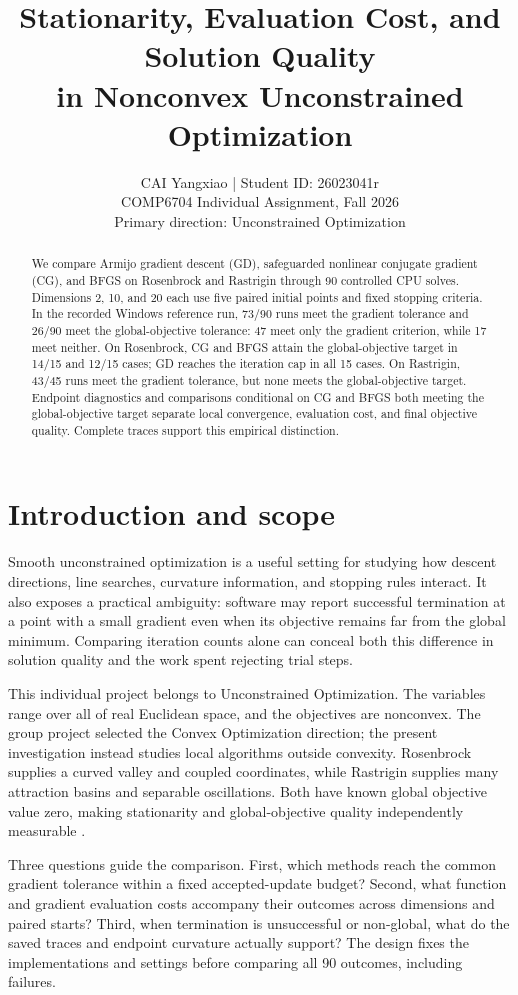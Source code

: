 \documentclass[10pt]{article}
\title{Stationarity, Evaluation Cost, and Solution Quality\\ in Nonconvex Unconstrained Optimization}
\author{CAI Yangxiao  |  Student ID: 26023041r \\ COMP6704 Individual Assignment, Fall 2026 \\ Primary direction: Unconstrained Optimization}
\begin{document}
\maketitle
\begin{abstract}
We compare Armijo gradient descent (GD), safeguarded nonlinear conjugate gradient (CG), and BFGS on Rosenbrock and Rastrigin through 90 controlled CPU solves. Dimensions 2, 10, and 20 each use five paired initial points and fixed stopping criteria. In the recorded Windows reference run, 73/90 runs meet the gradient tolerance and 26/90 meet the global-objective tolerance: 47 meet only the gradient criterion, while 17 meet neither. On Rosenbrock, CG and BFGS attain the global-objective target in 14/15 and 12/15 cases; GD reaches the iteration cap in all 15 cases. On Rastrigin, 43/45 runs meet the gradient tolerance, but none meets the global-objective target. Endpoint diagnostics and comparisons conditional on CG and BFGS both meeting the global-objective target separate local convergence, evaluation cost, and final objective quality. Complete traces support this empirical distinction.

\end{abstract}
\setcounter{section}{0}
\section{Introduction and scope}
Smooth unconstrained optimization is a useful setting for studying how descent directions, line searches, curvature information, and stopping rules interact. It also exposes a practical ambiguity: software may report successful termination at a point with a small gradient even when its objective remains far from the global minimum. Comparing iteration counts alone can conceal both this difference in solution quality and the work spent rejecting trial steps.

This individual project belongs to Unconstrained Optimization. The variables range over all of real Euclidean space, and the objectives are nonconvex. The group project selected the Convex Optimization direction; the present investigation instead studies local algorithms outside convexity. Rosenbrock supplies a curved valley and coupled coordinates, while Rastrigin supplies many attraction basins and separable oscillations. Both have known global objective value zero, making stationarity and global-objective quality independently measurable \cite{ref7,ref8}.

Three questions guide the comparison. First, which methods reach the common gradient tolerance within a fixed accepted-update budget? Second, what function and gradient evaluation costs accompany their outcomes across dimensions and paired starts? Third, when termination is unsuccessful or non-global, what do the saved traces and endpoint curvature actually support? The design fixes the implementations and settings before comparing all 90 outcomes, including failures.
\end{document}
